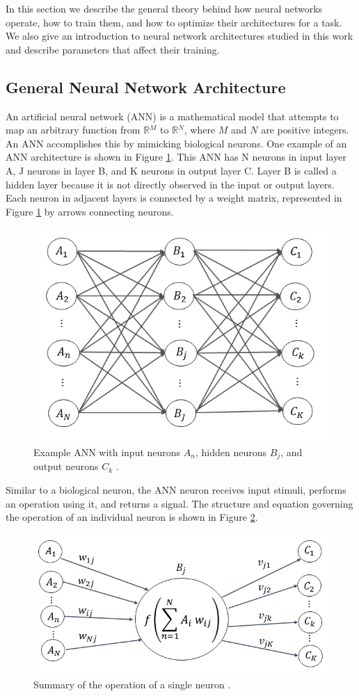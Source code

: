 In this section we describe the general theory behind how neural networks operate, how to train them, and how to optimize their architectures for a task. We also give an introduction to neural network architectures studied in this work and describe parameters that affect their training.


\subsection{General Neural Network Architecture}

An artificial neural network (ANN) is a mathematical model that attempts to map an arbitrary function from $\mathbb{R}{^M}$ to $\mathbb{R}{^N}$, where $M$ and $N$ are positive integers. An ANN accomplishes this by mimicking biological neurons. One example of an ANN architecture is shown in Figure \ref{fig:Network}. This ANN has N neurons in input layer A, J neurons in layer B, and K neurons in output layer C. Layer B is called a hidden layer because it is not directly observed in the input or output layers. Each neuron in adjacent layers is connected by a weight matrix, represented in Figure \ref{fig:Network} by arrows connecting neurons.


\begin{figure}[H]
\centering
\includegraphics[width=0.75\linewidth]{images/Network}
\caption{Example ANN with input neurons $A_n$, hidden neurons $B_j$, and output neurons $C_k$ \cite{kamuda2017}.}
\label{fig:Network}
\end{figure}


Similar to a biological neuron, the ANN neuron receives input stimuli, performs an operation using it, and returns a signal. The structure and equation governing the operation of an individual neuron is shown in Figure \ref{fig:Node}. 

\begin{figure}[H]
	\centering
	\includegraphics[width=0.75\linewidth]{images/Node_ABC_2}
	\caption{Summary of the operation of a single neuron \cite{kamuda2017}.}
	\label{fig:Node}
\end{figure}

